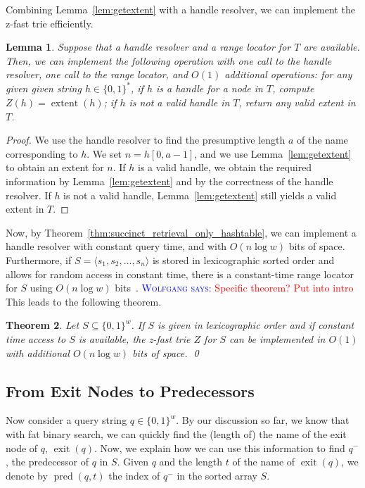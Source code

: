 \documentclass[a4paper,11pt]{article}
\newtheorem{theorem}{Theorem}[section]
\newtheorem{lemma}[theorem]{Lemma}
\newcommand{\?}{\mskip1.5mu}
\DeclareMathOperator{\exit}{exit}
\DeclareMathOperator{\extent}{extent}
\DeclareMathOperator{\pred}{pred}
\newcommand{\aremark}[3]{\textcolor{blue}{\textsc{#1 #2:}}
  \textcolor{red}{\textsf{#3}}}
\newcommand{\wolfgang}[2][says]{\aremark{Wolfgang}{#1}{#2}}
\begin{document}
Combining Lemma~\ref{lem:getextent} with a handle resolver,
we can implement the z-fast trie efficiently.

\begin{lemma}\label{lem:implementz}
Suppose that a handle resolver and a range locator for $T$ are 
available. Then, 
we can implement the following operation with one call to the
handle resolver, one call to the range locator, and $O(1)$
additional operations:
for any given given string $h \in \{0, 1\}^*$,
if $h$ is a handle for a node in $T$, compute
$Z(h) = \extent(h)$; 
if $h$ is not a valid handle in $T$, return
any valid extent in $T$.
\end{lemma}

\begin{proof}
We use the handle resolver to find the presumptive length
$a$ of the name corresponding to $h$.
We set $n = h[0, a - 1]$,  
and  we use Lemma~\ref{lem:getextent}
to obtain an extent for $n$.
If $h$ is a valid handle, we obtain the required information by
Lemma~\ref{lem:getextent} and by the correctness of the handle 
resolver. If $h$ is not a valid handle, 
Lemma~\ref{lem:getextent} still yields a valid extent in $T$.
\end{proof}

Now, by Theorem~\ref{thm:succinct_retrieval_only_hashtable},
we can implement a handle resolver with constant 
query time, and with $O(n \log w)$ bits of 
space.  Furthermore, if $S = \langle s_1, s_2, \dots, s_n\rangle$ 
is stored in lexicographic sorted order and allows for
random access in
constant time,
there is a constant-time range locator for $S$ using $O(n\log w)$
bits~\cite{BelazzouguiBoPaVi09}.
\wolfgang{Specific theorem? Put into intro}
This leads to the following theorem.

\begin{theorem}
\label{th:zfast}
Let $S \subseteq \{0, 1\}^w$.
If $S$ is given in lexicographic order and if constant time
access to $S$ is available, the z-fast trie $Z$ for $S$ can be
implemented in $O(1)$ with additional $O(n\log w)$ bits of space.
\qed
\end{theorem}

\subsection{From Exit Nodes to Predecessors}

Now consider a query string $q \in \{0, 1\}^w$.
By our discussion so far, we know that
with fat binary search, we can quickly find the 
(length of) the name of the exit node of $q$, $\exit(q)$. 
Now, we explain how we can use this
information to find $q^-$, the predecessor of $q$ in $S$.
Given $q$ and the length $t$ of the name of $\exit(q)$, 
we denote by  $\pred(q, t)$ the index of $q^-$
in the sorted array $S$.
\end{document}
